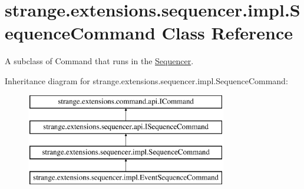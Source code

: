 \hypertarget{classstrange_1_1extensions_1_1sequencer_1_1impl_1_1_sequence_command}{\section{strange.\-extensions.\-sequencer.\-impl.\-Sequence\-Command Class Reference}
\label{classstrange_1_1extensions_1_1sequencer_1_1impl_1_1_sequence_command}
}


A subclass of Command that runs in the \hyperlink{classstrange_1_1extensions_1_1sequencer_1_1impl_1_1_sequencer}{Sequencer}.  


Inheritance diagram for strange.\-extensions.\-sequencer.\-impl.\-Sequence\-Command\-:\begin{figure}[H]
\begin{center}
\leavevmode
\includegraphics[height=4.000000cm]{classstrange_1_1extensions_1_1sequencer_1_1impl_1_1_sequence_command}
\end{center}
\end{figure}
